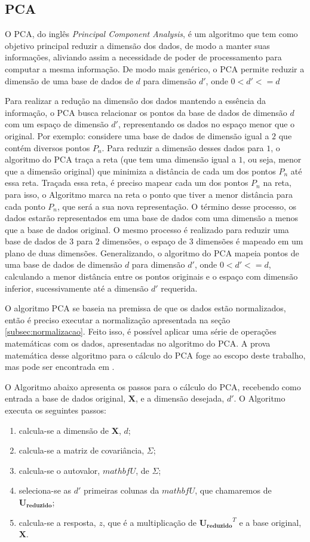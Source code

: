 \subsection{PCA}

O PCA, do inglês \textit{Principal Component Analysis}, é um algoritmo que tem como objetivo principal reduzir a dimensão dos dados, de modo a manter suas informações, aliviando assim a necessidade de poder de processamento para computar a mesma informação. De modo mais genérico, o PCA permite reduzir a dimensão de uma base de dados de $d$ para dimensão $d'$, onde $0<d'<=d$ \cite{Jolliffe}

Para realizar a redução na dimensão dos dados mantendo a essência da informação, o PCA busca relacionar os pontos da base de dados de dimensão $d$ com um espaço de dimensão $d'$, representando os dados no espaço menor que o original. Por exemplo: considere uma base de dados de dimensão igual a $2$ que contém diversos pontos $P_n$. Para reduzir a dimensão desses dados para $1$, o algoritmo do PCA traça a reta (que tem uma dimensão igual a $1$, ou seja, menor que a dimensão original) que minimiza a distância de cada um dos pontos $P_n$ até essa reta. Traçada essa reta, é preciso mapear cada um dos pontos $P_n$ na reta, para isso, o Algoritmo marca na reta o ponto que tiver a menor distância para cada ponto $P_n$, que será a sua nova representação. O término desse processo, os dados estarão representados em uma base de dados com uma dimensão a menos que a base de dados original. O mesmo processo é realizado para reduzir uma base de dados de $3$ para $2$ dimensões, o espaço de $3$ dimensões é mapeado em um plano de duas dimensões. Generalizando, o algoritmo do PCA mapeia pontos de uma base de dados de dimensão $d$ para dimensão $d'$, onde $0<d'<=d$, calculando a menor distância entre os pontos originais e o espaço com dimensão inferior, sucessivamente até a dimensão $d'$ requerida. 

O algoritmo PCA se baseia na premissa de que os dados estão normalizados, então é preciso executar a normalização apresentada na seção \ref{subsec:normalizacao}. Feito isso, é possível aplicar uma série de operações matemáticas com os dados, apresentadas no algoritmo do PCA. A prova matemática desse algoritmo para o cálculo do PCA foge ao escopo deste trabalho, mas pode ser encontrada em \cite{Jolliffe}.

O Algoritmo abaixo apresenta os passos para o cálculo do PCA, recebendo como entrada a base de dados original, $\mathbf{X}$, e a dimensão desejada, $d'$. O Algoritmo executa os seguintes passos:  
\begin{enumerate}
    \item calcula-se a dimensão de $\mathbf{X}$, $d$;
    \item calcula-se a matriz de covariância, $\Sigma$;
    \item calcula-se o autovalor, $mathbf{U}$, de $\Sigma$;
    \item seleciona-se as $d'$ primeiras colunas da $mathbf{U}$, que chamaremos de $\mathbf{U_{reduzido}}$;
    \item calcula-se a resposta, $z$, que é a multiplicação de $\mathbf{U_{reduzido}}^T $ e a base original, $\mathbf{X}$.
\end{enumerate}

